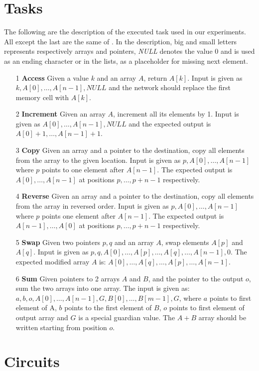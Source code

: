 \label{experiments}

\section{Tasks}
The following are the description of the executed task used in our experiments. All except the last are the same of \cite{NRAM:2016}. In the description, big and small letters represents respectively arrays and pointers, \textit{NULL} denotes the value 0 and is used as an ending character or in the lists, as a placeholder for missing next element.

\begin{itemize}
	\item[1]{\textbf{Access} Given a value $k$ and an array $A$, return $A[k]$. Input is given as $k, A[0], \dots, A[n-1], \textit{NULL}$ and the network should replace the first memory cell with $A[k]$.}
	\item[2]{\textbf{Increment} Given an array $A$, increment all its elements by 1. Input is given as $A[0], \dots, A[n-1], \textit{NULL}$ and the expected output is $A[0] + 1, \dots, A[n-1] + 1$.}
	\item[3]{\textbf{Copy} Given an array and a pointer to the destination, copy all elements from the array to the given location. Input is given as $p, A[0], \dots, A[n-1]$ where $p$ points to one element after $A[n-1]$. The expected output is $A[0], \dots, A[n-1]$ at positions $p, \dots, p+n-1$ respectively.}
	\item[4]{\textbf{Reverse} Given an array and a pointer to the destination, copy all elements from the array in reversed order. Input is given as $p, A[0], \dots, A[n-1]$ where $p$ points one element after $A[n-1]$. The expected output is $A[n-1], \dots, A[0]$ at positions $p, \dots, p+n-1$ respectively.}
	\item[5]{\textbf{Swap} Given two pointers $p, q$ and an array $A$, swap elements $A[p]$ and $A[q]$. Input is given as $p, q, A[0], \dots, A[p], \dots, A[q], \dots, A[n-1], 0$. The expected modified array $A$ is: $A[0], \dots, A[q], \dots, A[p], \dots, A[n-1]$.}
	\item[6]{\textbf{Sum} Given pointers to 2 arrays $A$ and $B$, and the pointer to the output $o$, sum the two arrays into one array. The input is given as: $a, b, o, A[0], \dots, A[n-1], G, B[0], \dots, B[m-1], G$, where $a$ points to first element of A, $b$ points to the first element of $B$, $o$ points to first element of output array and $G$ is a special guardian value. The $A+B$ array should be written starting from position $o$.}
\end{itemize}
\section{Circuits}